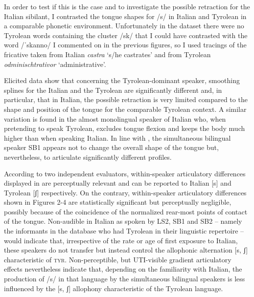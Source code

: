 \documentclass[output=paper]{LSP/langsci}
\begin{document}
In order to test if this is the case and to investigate the possible retraction for the Italian sibilant, I contrasted the tongue shapes for /s/ in Italian and Tyrolean in a comparable phonetic environment. Unfortunately in the dataset there were no Tyrolean words containing the cluster /sk/ that I could have contrasted with the word /ˈskanno/ I commented on in the previous figures, so I used tracings of the fricative taken from Italian \textit{castra} `s/he castrates' and from Tyrolean \textit{odminischtrativor} `administrative'.



Elicited data show that concerning the Tyrolean-dominant speaker, smoothing splines for the Italian and the Tyrolean  are significantly different and, in particular, that in Italian, the possible retraction is very limited compared to the shape and position of the tongue for the comparable Tyrolean context. A similar variation is found in the almost monolingual speaker of Italian who, when pretending to speak Tyrolean, excludes tongue flexion and keeps the body much higher than when speaking Italian. In line with , the simultaneous bilingual speaker SB1 appears not to change the overall shape of the tongue but, nevertheless, to articulate significantly different profiles.

According to two independent evaluators, within-speaker articulatory differences displayed in  are perceptually relevant and can be reported to Italian [s] and Tyrolean [ʃ] respectively. On the contrary, within-speaker articulatory differences shown in Figures 2-4 are statistically significant but perceptually negligible, possibly because of the coincidence of the normalized rear-most points of contact of the tongue. Non-audible  in Italian as spoken by LS2, SB1 and SB2 – namely the informants in the database who had Tyrolean in their linguistic repertoire – would indicate that, irrespective of the rate or age of first exposure to Italian, these speakers do not transfer but instead control the allophonic alternation [s, ʃ] characteristic of \textsc{tyr}. Non-perceptible, but UTI-visible gradient articulatory effects nevertheless indicate that, depending on the familiarity with Italian, the production of /s/ in that language by the simultaneous bilingual speakers is less influenced by the [s, ʃ] allophony characteristic of the Tyrolean language.
\end{document}
